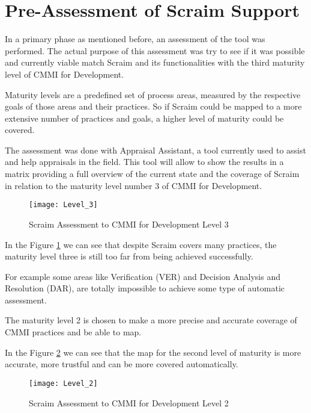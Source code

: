 \section{Pre-Assessment of Scraim Support}

In a primary phase as mentioned before, an assessment of the tool was performed. The actual purpose of this assessment was try to see if it was possible and currently viable match Scraim and its functionalities with the third maturity level of CMMI for Development.

Maturity levels are a predefined set of process areas, measured by the respective goals of those areas and their practices. So if Scraim could be mapped to a more extensive number of practices and goals, a higher level of maturity could be covered.

The assessment was done with Appraisal Assistant, a tool currently used to assist and help appraisals in the field. This tool will allow to show the results in a matrix providing a full overview of the current state and the coverage of Scraim in relation to the maturity level number 3 of CMMI for Development.


\begin{figure}[h]
	\begin{center}
		\leavevmode
		\texttt{[image: Level\_3]}
		\caption{Scraim Assessment to CMMI for Development Level 3}
		\label{fig:level3}
	\end{center}
\end{figure}

In the Figure \ref{fig:level3} we can see that despite Scraim covers many practices, the maturity level three is still too far from being achieved successfully.

For example some areas like Verification (VER) and Decision Analysis and Resolution (DAR), are totally impossible to achieve some type of automatic assessment.

The maturity level 2 is chosen to make a more precise and accurate coverage of CMMI practices and be able to map.

In the Figure \ref{fig:level2} we can see that the map for the second level of maturity is more accurate, more trustful and can be more covered automatically.
	
\begin{figure}[h]
	\begin{center}
		\leavevmode
		\texttt{[image: Level\_2]}
		\caption{Scraim Assessment to CMMI for Development Level 2}
		\label{fig:level2}
	\end{center}
\end{figure}

